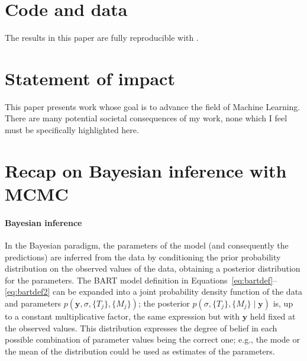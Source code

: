 \documentclass{article}
\begin{document}
    \section*{Code and data}

    The results in this paper are fully reproducible with
    \citet{petrillo2024e}.


    \section*{Statement of impact}

    This paper presents work whose goal is to advance the field of Machine Learning. There are many potential societal consequences of my work, none which I feel must be specifically highlighted here.




\clearpage
\appendix

    \section{Recap on Bayesian inference with MCMC}
    \label{sec:bayesrecap}

    \paragraph{Bayesian inference}

    In the Bayesian paradigm, the parameters of the model (and consequently the predictions) are inferred from the data by conditioning the prior probability distribution on the observed values of the data, obtaining a posterior distribution for the parameters. The BART model definition in Equations~\ref{eq:bartdef}--\ref{eq:bartdef2} can be expanded into a joint probability density function of the data and parameters $p(\mathbf y, \sigma, \{T_j\}, \{M_j\})$; the posterior $p(\sigma, \{T_j\}, \{M_j\}\mid \mathbf y)$ is, up to a constant multiplicative factor, the same expression but with $\mathbf y$ held fixed at the observed values. This distribution expresses the degree of belief in each possible combination of parameter values being the correct one; e.g., the mode or the mean of the distribution could be used as estimates of the parameters.
\end{document}
